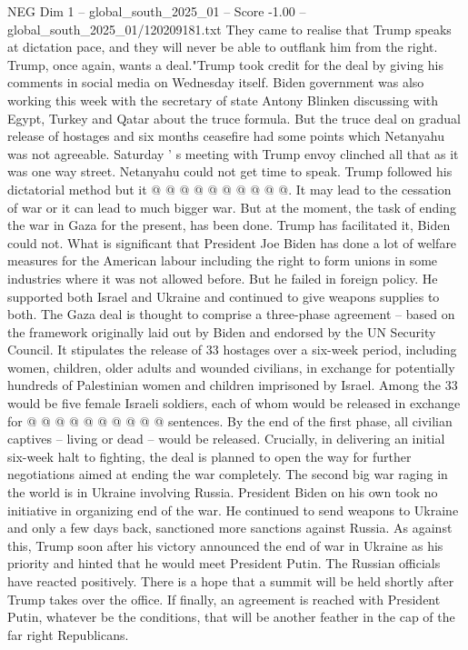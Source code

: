 \begin{textsample}{NEG Dim 1 – global\_south\_2025\_01 – Score -1.00 – global\_south\_2025\_01/120209181.txt}
They came to realise that Trump speaks at dictation pace, and they will never be able to outflank him from the right.
Trump, once again, wants a deal."Trump took credit for the deal by giving his comments in social media on Wednesday itself.
Biden government was also working this week with the secretary of state Antony Blinken discussing with Egypt, Turkey and Qatar about the truce formula.
But the truce deal on gradual release of hostages and six months ceasefire had some points which Netanyahu was not agreeable.
Saturday ' s meeting with Trump envoy clinched all that as it was one way street.
Netanyahu could not get time to speak.
Trump followed his dictatorial method but it @ @ @ @ @ @ @ @ @ @.
It may lead to the cessation of war or it can lead to much bigger war.
But at the moment, the task of ending the war in Gaza for the present, has been done.
Trump has facilitated it, Biden could not.
What is significant that President Joe Biden has done a lot of welfare measures for the American labour including the right to form unions in some industries where it was not allowed before.
But he failed in foreign policy.
He supported both Israel and Ukraine and continued to give weapons supplies to both.
The Gaza deal is thought to comprise a three-phase agreement -- based on the framework originally laid out by Biden and endorsed by the UN Security Council.
It stipulates the release of 33 hostages over a six-week period, including women, children, older adults and wounded civilians, in exchange for potentially hundreds of Palestinian women and children imprisoned by Israel.
Among the 33 would be five female Israeli soldiers, each of whom would be released in exchange for @ @ @ @ @ @ @ @ @ @ sentences.
By the end of the first phase, all civilian captives -- living or dead -- would be released.
Crucially, in delivering an initial six-week halt to fighting, the deal is planned to open the way for further negotiations aimed at ending the war completely.
The second big war raging in the world is in Ukraine involving Russia.
President Biden on his own took no initiative in organizing end of the war.
He continued to send weapons to Ukraine and only a few days back, sanctioned more sanctions against Russia.
As against this, Trump soon after his victory announced the end of war in Ukraine as his priority and hinted that he would meet President Putin.
The Russian officials have reacted positively.
There is a hope that a summit will be held shortly after Trump takes over the office.
If finally, an agreement is reached with President Putin, whatever be the conditions, that will be another feather in the cap of the far right Republicans.

\end{textsample}

